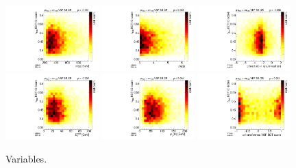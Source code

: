 \begin{figure}[tp]
  \includegraphics[width=0.32\textwidth]{figures/tauidcorrelations/tauid_vs_mjj}
  \includegraphics[width=0.32\textwidth]{figures/tauidcorrelations/tauid_vs_detajj}
  \includegraphics[width=0.32\textwidth]{figures/tauidcorrelations/tauid_vs_etaprod}
  \includegraphics[width=0.32\textwidth]{figures/tauidcorrelations/tauid_vs_metet}
  \includegraphics[width=0.32\textwidth]{figures/tauidcorrelations/tauid_vs_Hpt}
  \includegraphics[width=0.32\textwidth]{figures/tauidcorrelations/tauid_vs_bdt}
  \caption{Variables.}
  \label{fig:backgrounds-tauid-correlations}
\end{figure}

